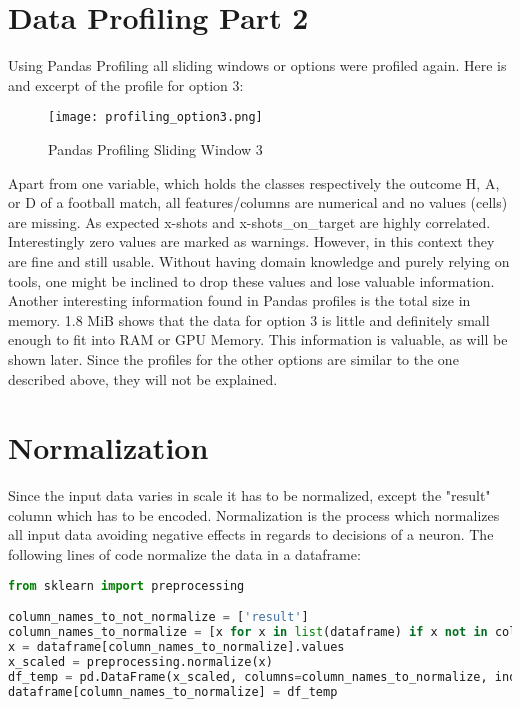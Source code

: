 \section {Data Profiling Part 2}

Using Pandas Profiling all sliding windows or options were profiled again. Here is and excerpt of the profile for option 3:

\begin{figure}[H]
\begin{center}
\texttt{[image: profiling\_option3.png]}
\end{center}
\caption{Pandas Profiling Sliding Window 3}
\label{fig:profiling_option3}
\end{figure}

Apart from one variable, which holds the classes respectively the outcome H, A, or D of a football match, all features/columns are numerical and no values (cells) are missing. As expected x-shots and x-shots\_on\_target are highly 
correlated. Interestingly zero values are marked as warnings. However, in this context they are fine and still usable. Without having domain knowledge and purely relying on tools, one might be inclined to drop these values and lose valuable information. Another interesting information found in Pandas profiles is the total size in memory. 1.8 MiB shows that the data for option 3 is little and definitely small enough to fit into RAM or GPU Memory. This information is valuable, as will be shown later.
\newline
Since the profiles for the other options are similar to the one described above, they will not be explained.

\section {Normalization}
Since the input data varies in scale it has to be normalized, except the "result" column which has to be encoded. Normalization is the process which normalizes all input data avoiding negative effects in regards to decisions of a neuron. 
The following lines of code normalize the data in a dataframe:

\begin{lstlisting}[language=Python, caption=Python code for normalization]
from sklearn import preprocessing

column_names_to_not_normalize = ['result']
column_names_to_normalize = [x for x in list(dataframe) if x not in column_names_to_not_normalize ]
x = dataframe[column_names_to_normalize].values
x_scaled = preprocessing.normalize(x)
df_temp = pd.DataFrame(x_scaled, columns=column_names_to_normalize, index = dataframe.index)
dataframe[column_names_to_normalize] = df_temp
\end{lstlisting}


